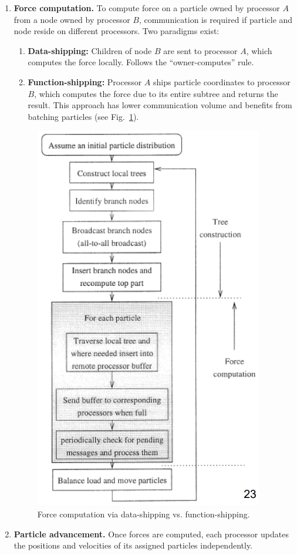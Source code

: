 \documentclass[12pt]{book}
\begin{document}
\begin{enumerate}
    \item \textbf{Force computation.} To compute force on a particle owned by processor $A$ from a node owned by processor $B$, communication is required if particle and node reside on different processors. Two paradigms exist:
    \begin{enumerate}
        \item \textbf{Data-shipping:} Children of node $B$ are sent to processor $A$, which computes the force locally. Follows the ``owner-computes'' rule.
        \item \textbf{Function-shipping:} Processor $A$ ships particle coordinates to processor $B$, which computes the force due to its entire subtree and returns the result. This approach has lower communication volume and benefits from batching particles (see Fig.~\ref{fig:forcecomp}).
    \end{enumerate}
    \begin{figure}[ht]
        \centering
        \includegraphics[width=0.5\linewidth]{images/nbodysimforcecom.png}
        \caption{Force computation via data-shipping vs. function-shipping.}
        \label{fig:forcecomp}
    \end{figure}

    \item \textbf{Particle advancement.} Once forces are computed, each processor updates the positions and velocities of its assigned particles independently.
\end{enumerate}
\end{document}
